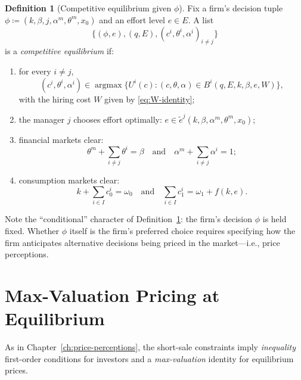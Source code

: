 \documentclass[11pt,a4paper,oneside]{book}
\def\et{\quad \text{and} \quad}
\DeclareMathOperator*{\argmax}{argmax}
\theoremstyle{plain}
\theoremstyle{definition}
\newtheorem{definition}[theorem]{Definition}
\theoremstyle{remark}
\numberwithin{equation}{chapter}
\begin{document}
\begin{definition}[Competitive equilibrium given $\phi$]\label{def:eq-MH-CPP}
Fix a firm's decision tuple $\phi \coloneqq (k, \beta, j, \alpha^m, \theta^m, x_0)$ and an effort level $e \in E$.
A list
\begin{equation*}
  \bigl\{ (\phi, e), (q, E), (c^i, \theta^i, \alpha^i)_{i \neq j} \bigr\}
\end{equation*}
is a \emph{competitive equilibrium} if:
\begin{enumerate}
  \item[(a)] for every $i \neq j$,
  \begin{equation*}
    (c^i, \theta^i, \alpha^i) \in \argmax \bigl\{ U^i(c) \colon (c, \theta, \alpha) \in B^i(q, E, k, \beta, e, W) \bigr\},
  \end{equation*}
  with the hiring cost $W$ given by \eqref{eq:W-identity};
  \item[(b)] the manager $j$ chooses effort optimally: $e \in \widetilde{e}^j(k, \beta, \alpha^m, \theta^m, x_0)$;
  \item[(c)] financial markets clear:
  \begin{equation*}
    \theta^m + \sum_{i \neq j} \theta^i = \beta
    \et
    \alpha^m + \sum_{i \neq j} \alpha^i = 1;
  \end{equation*}
  \item[(d)] consumption markets clear:
  \begin{equation*}
    k + \sum_{i \in I} c^i_0 = \omega_0
    \et
    \sum_{i \in I} c^i_1 = \omega_1 + f(k, e).
  \end{equation*}
\end{enumerate}
\end{definition}

Note the ``conditional'' character of Definition~\ref{def:eq-MH-CPP}: the firm's decision $\phi$ is held fixed.
Whether $\phi$ itself is the firm's preferred choice requires specifying how the firm anticipates alternative decisions being priced in the market---i.e., price perceptions.

\section{Max-Valuation Pricing at Equilibrium}
\label{sec:MH-CPP-pricing}

As in Chapter~\ref{ch:price-perceptions}, the short-sale constraints imply \emph{inequality} first-order conditions for investors and a \emph{max-valuation} identity for equilibrium prices.
\end{document}
